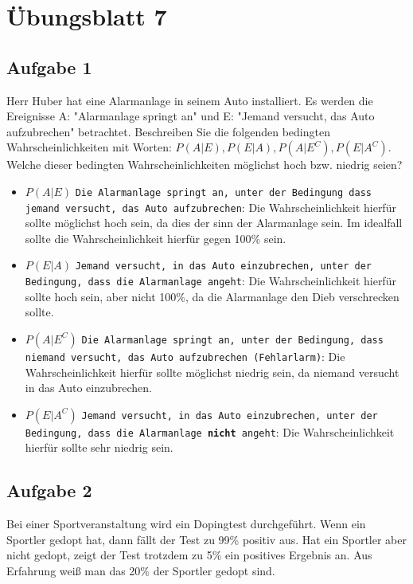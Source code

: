 \chapter{Übungsblatt 7}

\section{Aufgabe 1}

Herr Huber hat eine Alarmanlage in seinem Auto installiert. Es werden die Ereignisse A: "Alarmanlage springt an" und E: "Jemand versucht, das Auto aufzubrechen" betrachtet. Beschreiben Sie die folgenden bedingten Wahrscheinlichkeiten mit Worten: $P(A|E), P(E|A), P(A|E^C), P(E|A^C)$. Welche dieser bedingten Wahrscheinlichkeiten möglichst hoch bzw. niedrig seien?

\begin{itemize}
    \item $P(A|E)$ \texttt{Die Alarmanlage springt an, unter der Bedingung dass jemand versucht, das Auto aufzubrechen}: Die Wahrscheinlichkeit hierfür sollte möglichst hoch sein, da dies der sinn der Alarmanlage sein. Im idealfall sollte die Wahrscheinlichkeit hierfür gegen 100\% sein.
    \item $P(E|A)$ \texttt{Jemand versucht, in das Auto einzubrechen, unter der Bedingung, dass die Alarmanlage angeht}: Die Wahrscheinlichkeit hierfür sollte hoch sein, aber nicht 100\%, da die Alarmanlage den Dieb verschrecken sollte.
    \item $P(A|E^C)$ \texttt{Die Alarmanlage springt an, unter der Bedingung, dass niemand versucht, das Auto aufzubrechen (Fehlarlarm)}: Die Wahrscheinlichkeit hierfür sollte möglichst niedrig sein, da niemand versucht in das Auto einzubrechen.
    \item $P(E|A^C)$ \texttt{Jemand versucht, in das Auto einzubrechen, unter der Bedingung, dass die Alarmanlage \textbf{nicht} angeht}: Die Wahrscheinlichkeit hierfür sollte sehr niedrig sein.
\end{itemize}

\section{Aufgabe 2}

Bei einer Sportveranstaltung wird ein Dopingtest durchgeführt. Wenn ein Sportler gedopt hat, dann fällt der Test zu 99\% positiv aus. Hat ein Sportler aber nicht gedopt, zeigt der Test trotzdem zu 5\% ein positives Ergebnis an. Aus Erfahrung weiß man das 20\% der Sportler gedopt sind.

